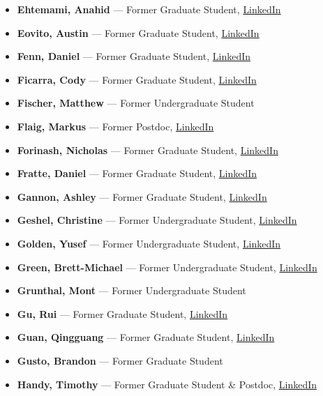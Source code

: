 \documentclass[12pt,a4paper]{article}
\begin{document}
\begin{itemize}
    \item \textbf{Ehtemami, Anahid} --- Former Graduate Student, \href{https://www.linkedin.com/in/anahid-ehtemami-53b75487/}{LinkedIn}
    \item \textbf{Eovito, Austin} --- Former Graduate Student, \href{https://www.linkedin.com/in/austin-eovito-12b77a151/}{LinkedIn}
    \item \textbf{Fenn, Daniel} --- Former Graduate Student, \href{https://www.linkedin.com/in/daniel-fenn-192135118/}{LinkedIn}
    \item \textbf{Ficarra, Cody} --- Former Graduate Student, \href{https://www.linkedin.com/in/cody-ficarra-520336125/}{LinkedIn}
    \item \textbf{Fischer, Matthew} --- Former Undergraduate Student
    \item \textbf{Flaig, Markus} --- Former Postdoc, \href{https://www.linkedin.com/in/markusflaig/}{LinkedIn}
    \item \textbf{Forinash, Nicholas} --- Former Graduate Student, \href{https://www.linkedin.com/in/nicholas-forinash-a20463b2/}{LinkedIn}
    \item \textbf{Fratte, Daniel} --- Former Graduate Student, \href{https://www.linkedin.com/in/daniel-fratte-13837910/}{LinkedIn}
    \item \textbf{Gannon, Ashley} --- Former Graduate Student, \href{https://www.linkedin.com/in/ashley-gannon-a7966a152/}{LinkedIn}
    \item \textbf{Geshel, Christine} --- Former Undergraduate Student, \href{https://www.linkedin.com/in/christine-geshel-1049b494/}{LinkedIn}
    \item \textbf{Golden, Yusef} --- Former Undergraduate Student, \href{https://www.linkedin.com/in/yusef-golden-157790104/}{LinkedIn}
    \item \textbf{Green, Brett-Michael} --- Former Undergraduate Student, \href{https://www.linkedin.com/in/brett-michael-green-2253b7119/}{LinkedIn}
    \item \textbf{Grunthal, Mont} --- Former Undergraduate Student
    \item \textbf{Gu, Rui} --- Former Graduate Student, \href{https://www.linkedin.com/in/rui-gu-9a287957/}{LinkedIn}
    \item \textbf{Guan, Qingguang} --- Former Graduate Student, \href{https://www.linkedin.com/in/qingguang-guan-84955b25/}{LinkedIn}
    \item \textbf{Gusto, Brandon} --- Former Graduate Student
    \item \textbf{Handy, Timothy} --- Former Graduate Student \& Postdoc, \href{https://www.linkedin.com/in/timothy-handy-9a84a617/}{LinkedIn}

\end{itemize}
\end{document}
